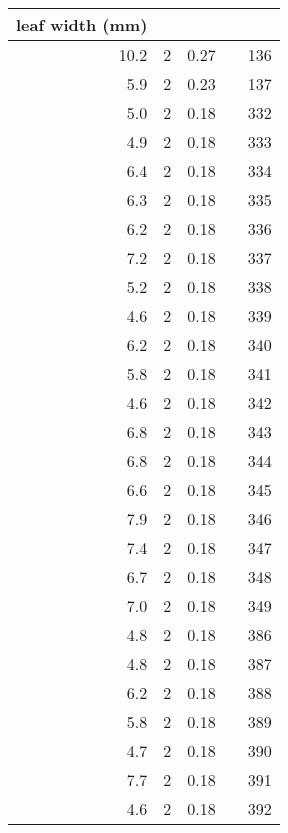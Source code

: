 \documentclass[12pt]{article}
\begin{document}
\begin{flushleft}
\begin{spacing}{1}
\begin{longtable}{rrrlr}
  \newpage
  \hline
  leaf width (mm) & & & & \\*
  \hline
  10.2 & 2 & 0.27 & \citet{knapp1995efd} & 136 \\* 
  5.9 &  2 & 0.23 & \citet{knapp1995efd} & 137 \\* 
  5.0 &  2 & 0.18 & \citet{redfearn1997cam} & 332 \\* 
  4.9 &  2 & 0.18 & \citet{redfearn1997cam} & 333 \\* 
  6.4 &  2 & 0.18 & \citet{redfearn1997cam} & 334 \\* 
  6.3 &  2 & 0.18 & \citet{redfearn1997cam} & 335 \\* 
  6.2 &  2 & 0.18 & \citet{redfearn1997cam} & 336 \\* 
  7.2 &  2 & 0.18 & \citet{redfearn1997cam} & 337 \\* 
  5.2 &  2 & 0.18 & \citet{redfearn1997cam} & 338 \\* 
  4.6 &  2 & 0.18 & \citet{redfearn1997cam} & 339 \\* 
  6.2 &  2 & 0.18 & \citet{redfearn1997cam} & 340 \\* 
  5.8 &  2 & 0.18 & \citet{redfearn1997cam} & 341 \\* 
  4.6 &  2 & 0.18 & \citet{redfearn1997cam} & 342 \\* 
  6.8 &  2 & 0.18 & \citet{redfearn1997cam} & 343 \\* 
  6.8 &  2 & 0.18 & \citet{redfearn1997cam} & 344 \\* 
  6.6 &  2 & 0.18 & \citet{redfearn1997cam} & 345 \\* 
  7.9 &  2 & 0.18 & \citet{redfearn1997cam} & 346 \\* 
  7.4 &  2 & 0.18 & \citet{redfearn1997cam} & 347 \\* 
  6.7 &  2 & 0.18 & \citet{redfearn1997cam} & 348 \\* 
  7.0 &  2 & 0.18 & \citet{redfearn1997cam} & 349 \\* 
  4.8 &  2 & 0.18 & \citet{redfearn1997cam} & 386 \\* 
  4.8 &  2 & 0.18 & \citet{redfearn1997cam} & 387 \\* 
  6.2 &  2 & 0.18 & \citet{redfearn1997cam} & 388 \\* 
  5.8 &  2 & 0.18 & \citet{redfearn1997cam} & 389 \\* 
  4.7 &  2 & 0.18 & \citet{redfearn1997cam} & 390 \\* 
  7.7 &  2 & 0.18 & \citet{redfearn1997cam} & 391 \\* 
  4.6 &  2 & 0.18 & \citet{redfearn1997cam} & 392 \\* 

\end{longtable}
\end{spacing}
\end{flushleft}
\end{document}
